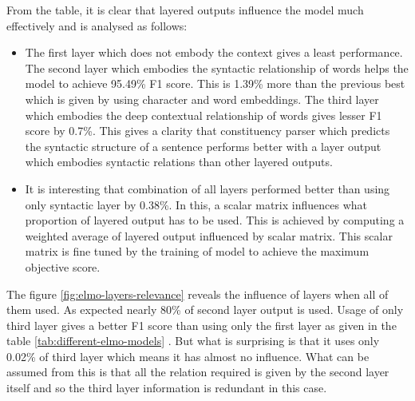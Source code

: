 \documentclass[a4paper, 11pt]{article}
\begin{document}
From the table, it is clear that layered outputs influence the model much effectively and is analysed as follows:
\begin{itemize}
\item The first layer which does not embody the context gives a least performance. The second layer which embodies the syntactic relationship of words helps the model to achieve 95.49\% F1 score. This is 1.39\% more than the previous best which is given by using character and word embeddings. The third layer which embodies the deep contextual relationship of words gives lesser F1 score by 0.7\%. This gives a clarity that constituency parser which predicts the syntactic structure of a sentence performs better with a layer output which embodies syntactic relations than other layered outputs. 
\item It is interesting that combination of all layers performed better than using only syntactic layer by 0.38\%. In this, a scalar matrix influences what proportion of layered output has to be used. This is achieved by computing a weighted average of layered output influenced by scalar matrix. This scalar matrix is fine tuned by the training of model to achieve the maximum objective score. 
\end{itemize}

The figure \ref{fig:elmo-layers-relevance} reveals the influence of layers when all of them used. As expected nearly 80\% of second layer output is used. Usage of only third layer gives a better F1 score than using only the first layer as given in the table \ref{tab:different-elmo-models} . But what is surprising is that it uses only 0.02\% of third layer which means it has almost no influence. What can be assumed from this is that all the relation required is given by the second layer itself and so the third layer information is redundant in this case. 
\end{document}
